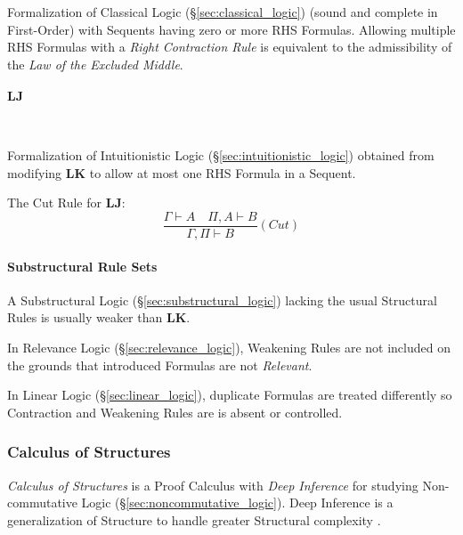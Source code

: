 Formalization of Classical Logic (\S\ref{sec:classical_logic})
(sound and complete in First-Order) with Sequents having zero or more
RHS Formulas. Allowing multiple RHS Formulas with a \emph{Right
  Contraction Rule} is equivalent to the admissibility of the
\emph{Law of the Excluded Middle}.



\paragraph{$\mathbf{LJ}$}\label{sec:lj} \hfill \\\hfill

Formalization of Intuitionistic Logic
(\S\ref{sec:intuitionistic_logic}) obtained from modifying
$\mathbf{LK}$ to allow at most one RHS Formula in a Sequent.

The Cut Rule for $\mathbf{LJ}$:
\[
  \frac{
    \Gamma \vdash A \quad \Pi, A \vdash B
  }{
    \Gamma, \Pi \vdash B
  }(Cut)
\]



\paragraph{Substructural Rule Sets}\label{sec:substructural_rule}\hfill

A Substructural Logic (\S\ref{sec:substructural_logic}) lacking the
usual Structural Rules is usually weaker than $\mathbf{LK}$.

In Relevance Logic (\S\ref{sec:relevance_logic}), Weakening Rules
are not included on the grounds that introduced Formulas are not
\emph{Relevant}.

In Linear Logic (\S\ref{sec:linear_logic}), duplicate Formulas are
treated differently so Contraction and Weakening Rules are is absent
or controlled.



\subsubsection{Calculus of Structures}\label{sec:calculus_of_structures}

\emph{Calculus of Structures} is a Proof Calculus with \emph{Deep
  Inference} for studying Non-commutative Logic
(\S\ref{sec:noncommutative_logic}). Deep Inference is a
generalization of Structure to handle greater Structural complexity
\cite{schutte77}.



